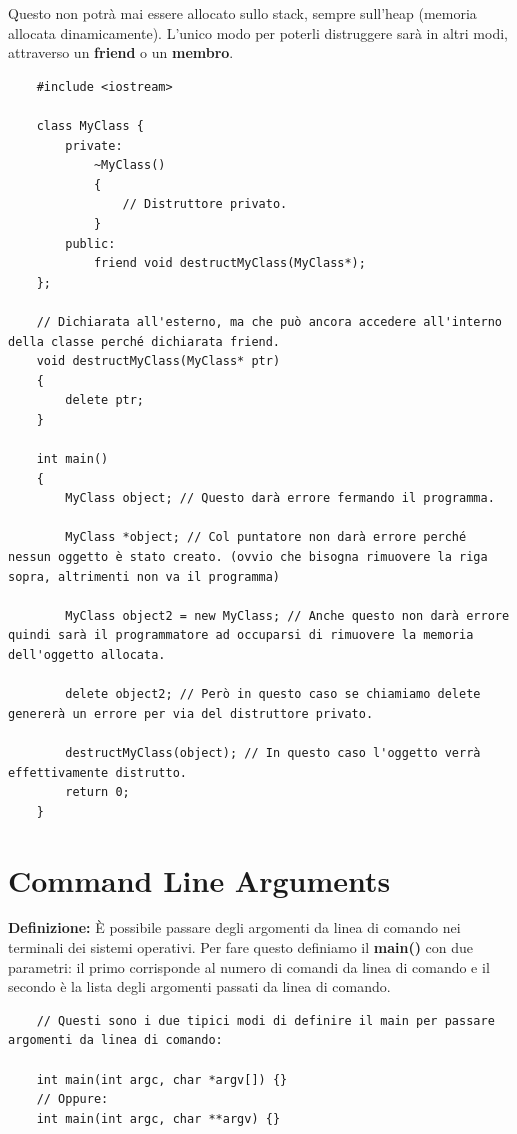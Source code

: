 \textsf{\small Questo non potrà mai essere allocato sullo stack, sempre sull'heap (memoria allocata dinamicamente). L'unico modo per poterli distruggere sarà in altri modi, attraverso un \textbf{friend} o un \textbf{membro}.} \\

\begin{lstlisting}
	#include <iostream>
	
	class MyClass {
		private:
			~MyClass() 
			{
				// Distruttore privato.
			}
		public:
			friend void destructMyClass(MyClass*);
	};

	// Dichiarata all'esterno, ma che può ancora accedere all'interno della classe perché dichiarata friend.
	void destructMyClass(MyClass* ptr)
	{
		delete ptr;
	}

	int main()
	{
		MyClass object; // Questo darà errore fermando il programma.
		
		MyClass *object; // Col puntatore non darà errore perché nessun oggetto è stato creato. (ovvio che bisogna rimuovere la riga sopra, altrimenti non va il programma)
		
		MyClass object2 = new MyClass; // Anche questo non darà errore quindi sarà il programmatore ad occuparsi di rimuovere la memoria dell'oggetto allocata.
		
		delete object2; // Però in questo caso se chiamiamo delete genererà un errore per via del distruttore privato.
		
		destructMyClass(object); // In questo caso l'oggetto verrà effettivamente distrutto.
		return 0;
	}
\end{lstlisting}


\newpage

\section{Command Line Arguments} %

\textsf{\small \textbf{Definizione: } È possibile passare degli argomenti da linea di comando nei terminali dei sistemi operativi. Per fare questo definiamo il \textbf{main()} con due parametri: il primo corrisponde al numero di comandi da linea di comando e il secondo è la lista degli argomenti passati da linea di comando.} \\

\begin{lstlisting}
	// Questi sono i due tipici modi di definire il main per passare argomenti da linea di comando:
	
	int main(int argc, char *argv[]) {}
	// Oppure:
	int main(int argc, char **argv) {} 
\end{lstlisting}

